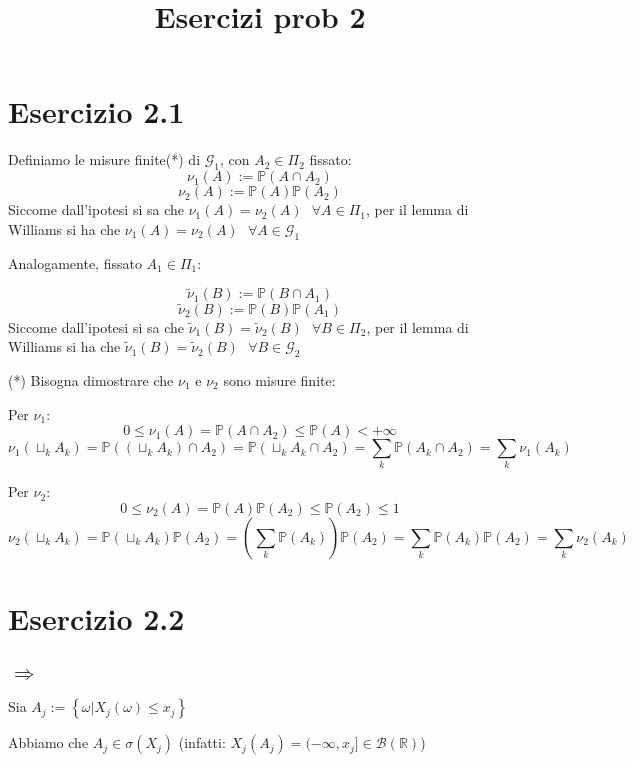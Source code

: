 \documentclass{article}
\title{Esercizi prob 2}
\begin{document}
\maketitle
\section{Esercizio 2.1}
Definiamo le misure finite(*) di $\mathcal{G}_1$, con $A_2\in \Pi _2$ fissato:
\[\nu _1(A) := \mathbb{P}(A \cap  A_2)\]
\[\nu _2(A) := \mathbb{P}(A)\mathbb{P}(A_2)\]
Siccome dall'ipotesi si sa che $\nu _1(A) = \nu _2(A)\ \ \ \forall A\in \Pi _1$, per il lemma di Williams si ha che $\nu _1(A)=\nu _2(A)\ \ \ \forall A\in \mathcal{G}_1$

Analogamente, fissato $A_1\in \Pi _1$: 

\[\tilde{\nu} _1(B) := \mathbb{P}(B \cap  A_1)\]
\[\tilde{\nu} _2(B) := \mathbb{P}(B)\mathbb{P}(A_1)\]
Siccome dall'ipotesi si sa che $\tilde{\nu} _1(B) = \tilde{\nu} _2(B)\ \ \ \forall B\in \Pi _2$, per il lemma di Williams si ha che $\tilde{\nu} _1(B)=\tilde{\nu} _2(B)\ \ \ \forall B\in \mathcal{G}_2$



(*) Bisogna dimostrare che $\nu _1$ e $\nu _2$ sono misure finite:

Per $\nu _1$:
\[0\leq  \nu _1(A) = \mathbb{P}(A\cap A_2) \leq  \mathbb{P}(A)<+\infty \]
\[\nu _1\left(\sqcup _k A_k\right) = \mathbb{P}\left(\left(\sqcup _kA_k\right)\cap A_2\right) = \mathbb{P}\left(\sqcup _kA_k\cap A_2\right) = \sum_{k}\mathbb{P}\left(A_k\cap A_2\right) = \sum_k \nu _1(A_k)\]

Per $\nu _2$:
\[0\leq  \nu _2(A) = \mathbb{P}(A)\mathbb{P}(A_2) \leq  \mathbb{P}(A_2) \leq 1 \]
\[\nu _2\left(\sqcup _k A_k\right) = \mathbb{P}\left(\sqcup _kA_k\right)\mathbb{P}(A_2) = \left(\sum_{k}\mathbb{P}(A_k)\right)\mathbb{P}(A_2) = \sum_{k}\mathbb{P}(A_k)\mathbb{P}(A_2) = \sum_k \nu _2(A_k)\] 



\section{Esercizio 2.2}
\subsection{$\Rightarrow $}
Sia $A_j := \left\{\omega | X_j(\omega) \leq  x_j \right\}$

Abbiamo che $A_j \in \sigma(X_j)$ (infatti: $X_j(A_j) = (-\infty , x_j] \in \mathcal{B}(\mathbb{R})$)
\end{document}
